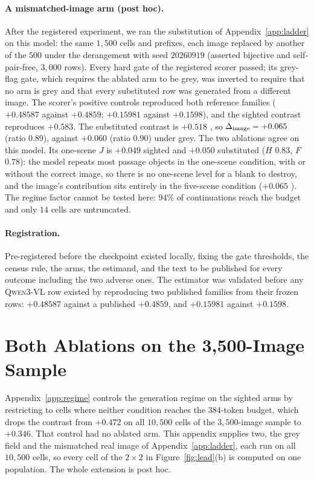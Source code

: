 \paragraph{A mismatched-image arm (post hoc).} After the registered experiment, we ran the substitution of
Appendix~\ref{app:ladder} on this model: the same $1{,}500$ cells and prefixes, each image replaced by
another of the $500$ under the derangement with seed $20260919$ (asserted bijective and self-pair-free,
$3{,}000$ rows). Every hard gate of the registered scorer passed; its grey-flag gate, which requires the
ablated arm to be grey, was inverted to require that no arm is grey and that every substituted row was
generated from a different image. The scorer's positive controls reproduced both reference families
($+0.48587$ against $+0.4859$; $+0.15981$ against $+0.1598$), and the sighted contrast reproduces
$+0.583$. The substituted contrast is $+0.518$ , so $\Delta_{\mathrm{image}} = +0.065$
 (ratio $0.89$), against $+0.060$  (ratio $0.90$) under grey.
The two ablations agree on this model. Its one-scene $J$ is $+0.049$ sighted and $+0.050$ substituted
($H$ $0.83$, $F$ $0.78$): the model repeats most passage objects in the one-scene condition, with
or without the correct image, so there is no one-scene level for a blank to destroy, and the image's
contribution sits entirely in the five-scene condition ($+0.065$ ). The regime
factor cannot be tested here: $94\%$ of continuations reach the budget and only $14$ cells are
untruncated.

\paragraph{Registration.} Pre-registered before the checkpoint existed locally, fixing the gate
thresholds, the census rule, the arms, the estimand, and the text to be published for every outcome
including the two adverse ones. The estimator was validated before any \textsc{Qwen3-VL} row existed
by reproducing two published families from their frozen rows: $+0.48587$ against a published
$+0.4859$, and $+0.15981$ against $+0.1598$.


\section{Both Ablations on the 3{,}500-Image Sample}
\label{app:regimeblind}

Appendix~\ref{app:regime} controls the generation regime on the sighted arms by restricting to
cells where neither condition reaches the $384$-token budget, which drops the contrast from
$+0.472$ on all $10{,}500$ cells of the $3{,}500$-image sample to $+0.346$. That control had no
ablated arm. This appendix supplies two, the grey field and the mismatched real image of
Appendix~\ref{app:ladder}, each run on all $10{,}500$ cells, so every cell of the $2 \times 2$ in
Figure~\ref{fig:lead}(b) is computed on one population. The whole extension is post hoc.

